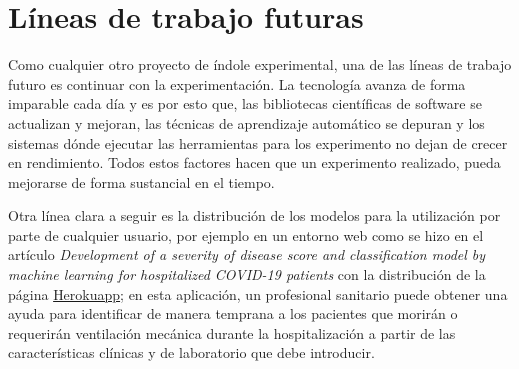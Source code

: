 \section{Líneas de trabajo futuras}

Como cualquier otro proyecto de índole experimental, una de las líneas de trabajo futuro es continuar con la experimentación. La tecnología avanza de forma imparable cada día y es por esto que, las bibliotecas científicas de software se actualizan y mejoran, las técnicas de aprendizaje automático se depuran y los sistemas dónde ejecutar las herramientas para los experimento no dejan de crecer en rendimiento. Todos estos factores hacen que un experimento realizado, pueda mejorarse de forma sustancial en el tiempo.

Otra línea clara a seguir es la distribución de los modelos para la utilización por parte de cualquier usuario, por ejemplo en un entorno web como se hizo en el artículo \textit{Development of a severity of disease score and classification model by machine learning for hospitalized COVID-19 patients} \cite{marcos:2021} con la distribución de la página \href{https://covid19salamanca-score.herokuapp.com/}{Herokuapp}; en esta aplicación, un profesional sanitario puede obtener una ayuda para identificar de manera temprana a los pacientes que morirán o requerirán ventilación mecánica durante la hospitalización a partir de las características clínicas y de laboratorio que debe introducir.